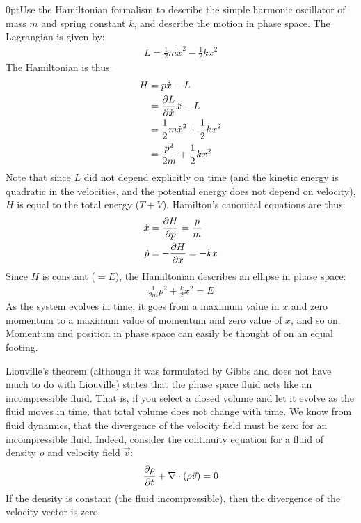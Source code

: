 \begin{example}{0pt}{Use the Hamiltonian formalism to describe the simple harmonic oscillator of mass $m$ and spring constant $k$, and describe the motion in phase space.}{}
The Lagrangian is given by:
\begin{align*}
L=\frac{1}{2}m\dot x^2-\frac{1}{2}kx^2
\end{align*}
The Hamiltonian is thus:
\begin{align*}
H&=p\dot x -L\\
 &= \frac{\partial L}{\partial \dot x} \dot x -L\\
 &=\frac{1}{2}m\dot x^2 + \frac{1}{2}kx^2\\
 &=\frac{p^2}{2m}+\frac{1}{2}kx^2
\end{align*}
Note that since $L$ did not depend explicitly on time (and the kinetic energy is quadratic in the velocities, and the potential energy does not depend on velocity), $H$ is equal to the total energy ($T+V$). Hamilton's canonical equations are thus:
\begin{align*}
\dot x&=\frac{\partial H}{\partial p} =\frac{p}{m}\\
\dot p &= -\frac{\partial H}{\partial x}=-kx
\end{align*}
Since $H$ is constant ($=E$), the Hamiltonian describes an ellipse in phase space:
\begin{align}
\frac{1}{2m}p^2+\frac{k}{2}x^2=E
\end{align}
As the system evolves in time, it goes from a maximum value in $x$ and zero momentum to a maximum value of momentum and zero value of $x$, and so on. Momentum and position in phase space can easily be thought of on an equal footing.
\end{example}

Liouville's theorem (although it was formulated by Gibbs and does not have much to do with Liouville) states that the phase space fluid acts like an incompressible fluid. That is, if you select a closed volume and let it evolve as the fluid moves in time, that total volume does not change with time. We know from fluid dynamics, that the divergence of the velocity field must be zero for an incompressible fluid. Indeed, consider the continuity equation for a fluid of density $\rho$ and velocity field $\vec v$:
\begin{align}
\frac{\partial \rho}{\partial t}+\nabla\cdot(\rho \vec v)=0
\end{align}
If the density is constant (the fluid incompressible), then the divergence of the velocity vector is zero.

